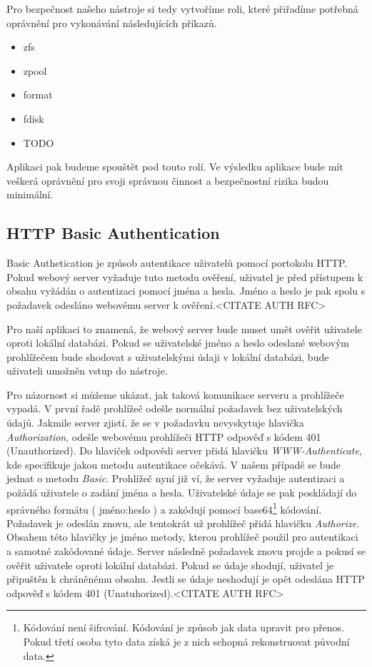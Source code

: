     Pro bezpečnost našeho nástroje si tedy vytvoříme roli, které přiřadíme potřebná oprávnění pro vykonávání následujících příkazů.
    \begin{itemize}
      \item zfs
      \item zpool
      \item format
      \item fdisk
      \item TODO
    \end{itemize}

    Aplikaci pak budeme spouštět pod touto rolí. Ve výsledku aplikace bude mít veškerá oprávnění pro svoji správnou činnost a bezpečnostní rizika budou minimální.
    \subsection{HTTP Basic Authentication}
    \label{httpauth}
    Basic Authetication je způsob autentikace uživatelů pomocí portokolu HTTP. Pokud webový server vyžaduje tuto metodu ověření, uživatel je před přístupem k obsahu vyžádán o autentizaci pomocí jména a hesla. Jméno a heslo je pak spolu s požadavek odesláno webovému server k ověření.<CITATE AUTH RFC>

    Pro naší aplikaci to znamená, že webový server bude muset umět ověřit uživatele oproti lokální databázi. Pokud se uživatelské jméno a heslo odeslané webovým prohlížečem bude shodovat s uživatelskými údaji v lokální databázi, bude uživateli umožněn vstup do nástroje.

    Pro názornost si můžeme ukázat, jak taková komunikace serveru a prohlížeče vypadá. V první řadě prohlížeč odešle normální požadavek bez uživatelských údajů. Jakmile server zjistí, že se v požadavku nevyskytuje hlavička \emph{Authorization}, odešle webovému prohlížeči HTTP odpověď s kódem 401 (Unauthorized). Do hlaviček odpovědi server přidá hlavičku \emph{WWW-Authenticate}, kde specifikuje jakou metodu autentikace očekává. V našem případě se bude jednat o metodu \emph{Basic}. Prohlížeč nyní již ví, že server vyžaduje autentizaci a požádá uživatele o zadání jména a hesla. Uživatelské údaje se pak poskládají do správného formátu ( jméno:heslo ) a zakódují pomocí base64\footnote{Kódování není šifrování. Kódování je způsob jak data upravit pro přenos. Pokud třetí osoba tyto data získá je z nich schopná rekonstruovat původní data.} kódování. Požadavek je odeslán znovu, ale tentokrát už prohlížeč přidá hlavičku \emph{Authorize}. Obsahem této hlavičky je jméno metody, kterou prohlížeč použil pro autentikaci a samotné zakódované údaje. Server následně požadavek znovu projde a pokusí se ověřit uživatele oproti lokální databázi. Pokud se údaje shodují, uživatel je připuštěn k chráněnému obsahu. Jestli se údaje neshodují je opět odeslána HTTP odpověď s kódem 401 (Unatuhorized).<CITATE AUTH RFC>

